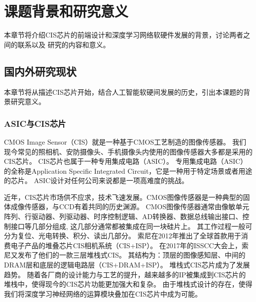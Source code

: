 
\chapter{课题背景和研究意义}

本章节将介绍CIS芯片的前端设计和深度学习网络软硬件发展的背景，讨论两者之间的联系以及
研究的内容和意义。

\section{国内外研究现状}
本章节将从描述CIS芯片开始，结合人工智能软硬间发展的历史，引出本课题的背景研究意义。


\subsection{ASIC与CIS芯片}
CMOS Image Sensor（CIS）就是一种基于CMOS工艺制造的图像传感器。
我们现今常见的照相机、安防摄像头、手机摄像头内使用的图像传感器大多都是采用的CIS芯片。
CIS芯片也属于一种专用集成电路（ASIC）。
专用集成电路（ASIC）的全称是Application Specific Integrated Circuit，它是一种用于特定场景或者用途的芯片。
ASIC设计对任何公司来说都是一项高难度的挑战。  

近年，CIS芯片市场供不应求，技术飞速发展。CMOS图像传感器是一种典型的固体成像传感器，与CCD有着共同的历史渊源。
CMOS图像传感器通常由像敏单元阵列、行驱动器、列驱动器、时序控制逻辑、AD转换器、数据总线输出接口、控制接口等几部分组成, 这几部分通常都被集成在同一块硅片上。
其工作过程一般可分为复位、光电转换、积分、读出几部分。  
索尼在2012年推出了全球首款用于消费电子产品的堆叠芯片CIS相机系统（CIS+ISP）。
在2017年的ISSCC大会上，索尼又发布了他们的一款三层堆栈式CIS\parencite{sony2017}。 %
其结构为：顶层的图像感知层、中间的DRAM层和底层的逻辑电路层（CIS+DRAM+ISP）。
堆栈式CIS芯片成为了发展趋势。
随着各厂商的设计能力与工艺的提升，越来越多的IP被集成到CIS芯片的堆栈中，使得现今的CIS芯片功能更加强大和复杂。
由于堆栈式设计的存在，使得我们将深度学习神经网络的运算模块叠加在CIS芯片中成为可能。  

